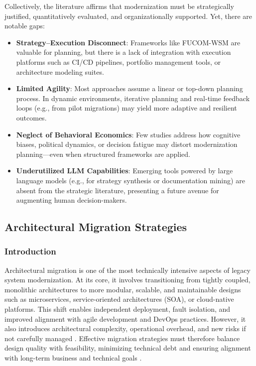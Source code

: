\documentclass[12pt]{article}
\begin{document}
Collectively, the literature affirms that modernization must be strategically justified, quantitatively evaluated, and organizationally supported. Yet, there are notable gaps:

\begin{itemize}
    \item \textbf{Strategy–Execution Disconnect}: Frameworks like FUCOM-WSM are valuable for planning, but there is a lack of integration with execution platforms such as CI/CD pipelines, portfolio management tools, or architecture modeling suites.
    \item \textbf{Limited Agility}: Most approaches assume a linear or top-down planning process. In dynamic environments, iterative planning and real-time feedback loops (e.g., from pilot migrations) may yield more adaptive and resilient outcomes.
    \item \textbf{Neglect of Behavioral Economics}: Few studies address how cognitive biases, political dynamics, or decision fatigue may distort modernization planning—even when structured frameworks are applied.
    \item \textbf{Underutilized LLM Capabilities}: Emerging tools powered by large language models (e.g., for strategy synthesis or documentation mining) are absent from the strategic literature, presenting a future avenue for augmenting human decision-makers.
\end{itemize}


\subsection{Architectural Migration Strategies}

\subsubsection{Introduction}

Architectural migration is one of the most technically intensive aspects of legacy system modernization. At its core, it involves transitioning from tightly coupled, monolithic architectures to more modular, scalable, and maintainable designs such as microservices, service-oriented architectures (SOA), or cloud-native platforms. This shift enables independent deployment, fault isolation, and improved alignment with agile development and DevOps practices. However, it also introduces architectural complexity, operational overhead, and new risks if not carefully managed \cite{wolfart2021}. Effective migration strategies must therefore balance design quality with feasibility, minimizing technical debt and ensuring alignment with long-term business and technical goals \cite{lenarduzzi2020, velepucha2023}.
\end{document}
